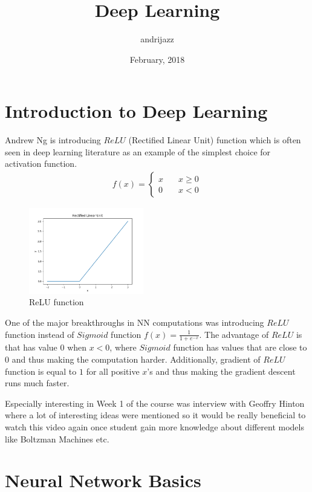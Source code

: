 \documentclass[a4paper]{article}
\title{Deep Learning}
\date{February, 2018}
\author{andrijazz}
\newcommand{\insertcode}[2]{\begin{itemize}\item[]\end{itemize}} %
\begin{document}
\maketitle


\section{Introduction to Deep Learning}
Andrew Ng is introducing $ReLU$ (Rectified Linear Unit) function which is often seen in deep learning literature as an example of the simplest choice for activation function. 
\begin{align}
f(x) =
	\begin{cases}
		x   & \quad x \geq 0\\
		0	& \quad x < 0
	\end{cases}
\end{align}

\begin{figure}[!h]
	\centering
	\includegraphics[width=50mm]{../plots/relu.png}
	\caption{ReLU function}
	\label{fig:relu}
\end{figure}

One of the major breakthroughs in NN computations was introducing $ReLU$ function instead of $Sigmoid$ function $f(x) = \frac{1}{1 + e ^{-x}}$. The advantage of $ReLU$ is that has value $0$ when $x < 0$, where $Sigmoid$ function has values that are close to $0$ and thus making the computation harder.
Additionally, gradient of $ReLU$ function is equal to $1$ for all positive $x$'s and thus making the gradient descent runs much faster.

Especially interesting in Week 1 of the course was interview with Geoffry Hinton where a lot of interesting ideas were mentioned so it would be really beneficial to watch this video again once student gain more knowledge about different models like Boltzman Machines etc.

\section{Neural Network Basics}
\end{document}
